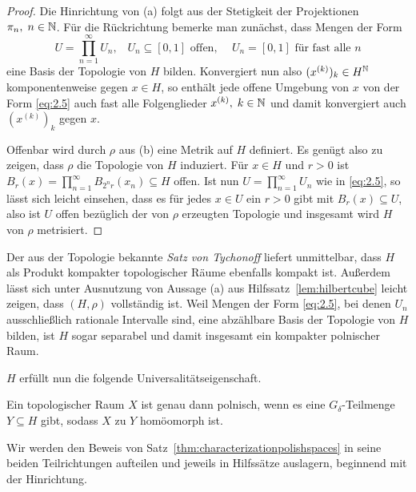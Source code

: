 \documentclass[../main/main.tex]{subfiles}
\begin{document}
	\begin{proof}
		Die Hinrichtung von (a) folgt aus der Stetigkeit der Projektionen 
		$\pi_n, \; n \in \mathbb{N}$. Für die Rückrichtung bemerke man zunächst, dass Mengen der Form 
		\[U = \prod_{n=1}^{\infty} U_n\text{,} \quad U_n \subseteq [0, 1] \text{ offen, }
		\quad U_n = [0, 1] \text{ für fast alle } n \label{eq:2.5} \tag{2.5}\]
		eine Basis der Topologie von $H$ bilden. 
		Konvergiert nun also $(x^{(k)})_k \in H^{\mathbb{N}}$ komponentenweise gegen $x \in H$, 
		so enthält jede offene Umgebung von $x$ von der Form \eqref{eq:2.5} auch fast 
		alle Folgenglieder $x^{(k)}, \; k \in \mathbb{N}$ und damit konvergiert 
		auch $(x^{(k)})_k$ gegen $x$.
		
		Offenbar wird durch $\rho$ aus (b) eine Metrik auf $H$ definiert. 
		Es genügt also zu zeigen, dass $\rho$ die Topologie von $H$ induziert. 
		Für $x \in H$ und $r > 0$ ist 
		$B_r(x) = \prod_{n=1}^{\infty} B_{2^n r}(x_n) \subseteq H$ 
		offen. Ist nun $U = \prod_{n=1}^{\infty} U_n$ wie in \eqref{eq:2.5}, 
		so lässt sich leicht einsehen, dass es für jedes $x \in U$ ein $r > 0$ 
		gibt mit $B_r(x) \subseteq U$, also ist $U$ offen bezüglich der von $\rho$ 
		erzeugten Topologie und insgesamt wird $H$ von $\rho$ metrisiert.
	\end{proof}
	
	Der aus der Topologie bekannte \emph{Satz von Tychonoff} liefert 
	unmittelbar, dass $H$ als Produkt kompakter topologischer Räume 
	ebenfalls kompakt ist.
	Außerdem lässt sich unter Ausnutzung von Aussage (a) aus 
	Hilfssatz~\ref{lem:hilbertcube} leicht zeigen, dass $(H, \rho)$ 
	vollständig ist. Weil Mengen der Form \eqref{eq:2.5}, bei denen 
	$U_n$ ausschließlich rationale Intervalle sind, eine abzählbare 
	Basis der Topologie von $H$ bilden, ist $H$ sogar separabel und 
	damit insgesamt ein kompakter polnischer Raum.
	
	$H$ erfüllt nun die folgende Universalitätseigenschaft.
	
	\begin{Satz}
		\label{thm:characterizationpolishspaces}
		Ein topologischer Raum $X$ ist genau dann polnisch, 
		wenn es eine $G_\delta$-Teilmenge $Y \subseteq H$ gibt, sodass $X$ 
		zu $Y$ homöomorph ist. 
	\end{Satz}

	Wir werden den Beweis von Satz~\ref{thm:characterizationpolishspaces} in seine beiden Teilrichtungen
	aufteilen und jeweils in Hilfssätze auslagern, beginnend mit der Hinrichtung.
	
\end{document}
